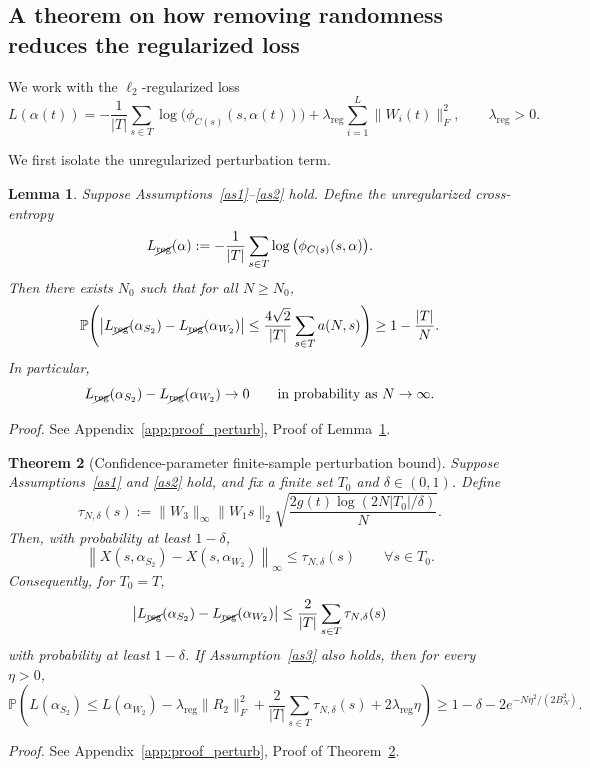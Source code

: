 \documentclass[11pt]{article}
\theoremstyle{plain}
\newtheorem{thm}{Theorem}[section]
\newtheorem{lem}[thm]{Lemma}
\theoremstyle{definition}
\theoremstyle{remark}
\newcommand{\PP}{\mathbb{P}}
\newcommand{\1}{\mathbf{1}}
\newcommand{\proofloc}[1]{\par\noindent\emph{Proof.} #1\par}
\begin{document}
\subsection{A theorem on how removing randomness reduces the regularized loss}

We work with the \(\ell_2\)-regularized loss
\begin{equation}
\label{loss_noise_det_1}
L(\alpha(t))
=
-\frac{1}{|T|}\sum_{s\in T}\log\big(\phi_{C(s)}(s,\alpha(t))\big)
+
\lambda_{\mathrm{reg}}
\sum_{i=1}^{L}\|W_i(t)\|_F^2,
\qquad \lambda_{\mathrm{reg}}>0.
\end{equation}

We first isolate the unregularized perturbation term.

\begin{lem}
\label{lem:remove_R_loosandacc}
Suppose Assumptions~\ref{as1}--\ref{as2} hold. Define the unregularized cross-entropy
\[
L_{\cancel{\mathrm{reg}}}(\alpha)
:=
-\frac{1}{|T|}\sum_{s\in T}\log\big(\phi_{C(s)}(s,\alpha)\big).
\]
Then there exists \(N_0\) such that for all \(N\ge N_0\),
\[
\PP\!\left(
\big|L_{\cancel{\mathrm{reg}}}(\alpha_{S_2})-L_{\cancel{\mathrm{reg}}}(\alpha_{W_2})\big|
\le
\frac{4\sqrt{2}}{|T|}\sum_{s\in T} a(N,s)
\right)
\ge
1-\frac{|T|}{N}.
\]
In particular,
\[
L_{\cancel{\mathrm{reg}}}(\alpha_{S_2})-L_{\cancel{\mathrm{reg}}}(\alpha_{W_2})
\to 0
\qquad\text{in probability as }N\to\infty.
\]
\end{lem}
\proofloc{See Appendix~\ref{app:proof_perturb}, Proof of Lemma~\ref{lem:remove_R_loosandacc}.}

\begin{thm}[Confidence-parameter finite-sample perturbation bound]
\label{thm:finite_confidence_gaussian}
Suppose Assumptions~\ref{as1} and \ref{as2} hold, and fix a finite set \(T_0\) and \(\delta\in(0,1)\). Define
\[
\tau_{N,\delta}(s)
:=
\|W_3\|_\infty\|W_1s\|_2
\sqrt{\frac{2g(t)\log(2N|T_0|/\delta)}{N}}.
\]
Then, with probability at least \(1-\delta\),
\[
\left\|X(s,\alpha_{S_2})-X(s,\alpha_{W_2})\right\|_\infty
\le \tau_{N,\delta}(s)
\qquad\forall s\in T_0.
\]
Consequently, for \(T_0=T\),
\[
\left|
L_{\cancel{\mathrm{reg}}}(\alpha_{S_2})
-
L_{\cancel{\mathrm{reg}}}(\alpha_{W_2})
\right|
\le
\frac{2}{|T|}\sum_{s\in T}\tau_{N,\delta}(s)
\]
with probability at least \(1-\delta\).
If Assumption~\ref{as3} also holds, then for every \(\eta>0\),
\[
\PP\!\left(
L(\alpha_{S_2})
\le
L(\alpha_{W_2})
-\lambda_{\mathrm{reg}}\|R_2\|_F^2
+\frac{2}{|T|}\sum_{s\in T}\tau_{N,\delta}(s)
+2\lambda_{\mathrm{reg}}\eta
\right)
\ge
1-\delta-2e^{-N\eta^2/(2B_N^2)}.
\]
\end{thm}
\proofloc{See Appendix~\ref{app:proof_perturb}, Proof of Theorem~\ref{thm:finite_confidence_gaussian}.}
\end{document}
